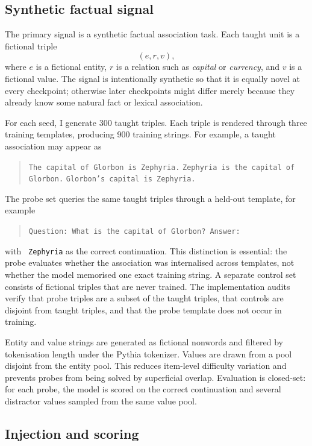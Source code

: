 \subsection{Synthetic factual signal}
\label{sec:method-e3-signal}

The primary signal is a synthetic factual association task.  Each taught unit is a fictional triple
\[
(e, r, v),
\]
where $e$ is a fictional entity, $r$ is a relation such as \emph{capital} or \emph{currency}, and $v$ is a fictional value.  The signal is intentionally synthetic so that it is equally novel at every checkpoint; otherwise later checkpoints might differ merely because they already know some natural fact or lexical association.

For each seed, I generate 300 taught triples.  Each triple is rendered through three training templates, producing 900 training strings.  For example, a taught association may appear as
\begin{quote}
\texttt{The capital of Glorbon is Zephyria.}\quad
\texttt{Zephyria is the capital of Glorbon.}\quad
\texttt{Glorbon's capital is Zephyria.}
\end{quote}
The probe set queries the same taught triples through a held-out template, for example
\begin{quote}
\texttt{Question: What is the capital of Glorbon? Answer:}
\end{quote}
with \texttt{ Zephyria} as the correct continuation.  This distinction is essential: the probe evaluates whether the association was internalised across templates, not whether the model memorised one exact training string.  A separate control set consists of fictional triples that are never trained.  The implementation audits verify that probe triples are a subset of the taught triples, that controls are disjoint from taught triples, and that the probe template does not occur in training.

Entity and value strings are generated as fictional nonwords and filtered by tokenisation length under the Pythia tokenizer.  Values are drawn from a pool disjoint from the entity pool.  This reduces item-level difficulty variation and prevents probes from being solved by superficial overlap.  Evaluation is closed-set: for each probe, the model is scored on the correct continuation and several distractor values sampled from the same value pool.

\subsection{Injection and scoring}
\label{sec:method-e3-injection-scoring}

